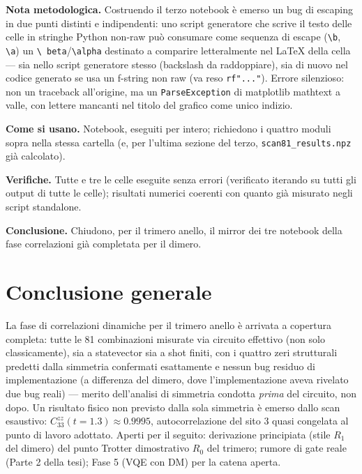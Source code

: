 \documentclass[11pt,a4paper]{article}
\begin{document}
\textbf{Nota metodologica.} Costruendo il terzo notebook è emerso un bug di
escaping in due punti distinti e indipendenti: uno script generatore che scrive il
testo delle celle in stringhe Python non-raw può consumare come sequenza di escape
(\texttt{\textbackslash b}, \texttt{\textbackslash a}) un \texttt{\textbackslash
beta}/\texttt{\textbackslash alpha} destinato a comparire letteralmente nel LaTeX
della cella — sia nello script generatore stesso (backslash da raddoppiare), sia
di nuovo nel codice generato se usa un f-string non raw (va reso \texttt{rf"..."}).
Errore silenzioso: non un traceback all'origine, ma un \texttt{ParseException} di
matplotlib mathtext a valle, con lettere mancanti nel titolo del grafico come unico
indizio.

\textbf{Come si usano.} Notebook, eseguiti per intero; richiedono i quattro moduli
sopra nella stessa cartella (e, per l'ultima sezione del terzo,
\texttt{scan81\_results.npz} già calcolato).

\textbf{Verifiche.} Tutte e tre le celle eseguite senza errori (verificato
iterando su tutti gli output di tutte le celle); risultati numerici coerenti con
quanto già misurato negli script standalone.

\textbf{Conclusione.} Chiudono, per il trimero anello, il mirror dei tre notebook
della fase correlazioni già completata per il dimero.

\section*{Conclusione generale}

La fase di correlazioni dinamiche per il trimero anello è arrivata a copertura
completa: tutte le 81 combinazioni misurate via circuito effettivo (non solo
classicamente), sia a statevector sia a shot finiti, con i quattro zeri
strutturali predetti dalla simmetria confermati esattamente e nessun bug residuo
di implementazione (a differenza del dimero, dove l'implementazione aveva rivelato
due bug reali) — merito dell'analisi di simmetria condotta \emph{prima} del
circuito, non dopo. Un risultato fisico non previsto dalla sola simmetria è emerso
dallo scan esaustivo: $C_{33}^{zz}(t{=}1.3)\approx0.9995$, autocorrelazione
del sito 3 quasi congelata al punto di lavoro adottato. Aperti per il seguito:
derivazione principiata (stile $R_1$ del dimero) del punto Trotter dimostrativo
$R_0$ del trimero; rumore di gate reale (Parte 2 della tesi); Fase 5 (VQE con DM)
per la catena aperta.
\end{document}

